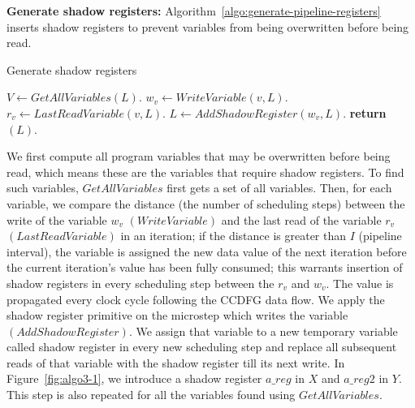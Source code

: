 {\bf Generate shadow registers:} Algorithm~\ref{algo:generate-pipeline-registers} inserts shadow registers
to prevent variables from being overwritten before being read. 

\begin{algorithm}[H]
\caption{Generate shadow registers} 
\label{algo:generate-pipeline-registers}
\begin{algorithmic}[1]
\State $V \leftarrow GetAllVariables(L)$.
\State $w_v \leftarrow WriteVariable (v, L)$.
\State $r_v \leftarrow LastReadVariable (v, L)$.
\State $L \leftarrow AddShadowRegister (w_v, L)$.
\EndIf
\EndFor
\State \textbf{return} $(L)$.
\EndProcedure
\end{algorithmic}
\end{algorithm}

We first compute all program variables that may be
overwritten before being read, which means these are the variables that require shadow registers. To find such variables,
 $GetAllVariables$ first gets a set of all variables. Then, for each variable, we compare the distance (the number of scheduling steps) between the write of
  the variable $w_v$ $(WriteVariable)$ and the last read of the variable $r_v$ $(LastReadVariable)$ in an iteration; if the
   distance is greater than $I$ (pipeline interval), the variable is assigned the new data value of the next iteration before the current iteration's value
    has been fully consumed; this warrants insertion of shadow registers in every scheduling step between the $r_v$ and $w_v$. The value is propagated every clock cycle following the CCDFG data flow.
We apply the shadow register primitive on the microstep which writes the variable $(AddShadowRegister)$. We assign that
 variable to a new temporary variable called shadow register in every new scheduling step and replace all subsequent reads of that variable with the shadow register till its next write. In Figure~\ref{fig:algo3-1}, we introduce a shadow register $a\_reg$ in $X$ and $a\_reg2$ in $Y$. This step is also repeated for all the variables found using $GetAllVariables$.




